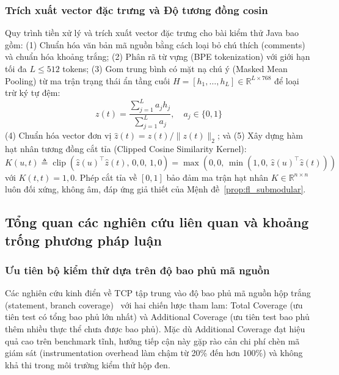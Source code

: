 \subsubsection{Trích xuất vector đặc trưng và Độ tương đồng cosin}
\label{subsubsec:embedding_cosine_similarity}

Quy trình tiền xử lý và trích xuất vector đặc trưng cho bài kiểm thử Java bao gồm: (1) Chuẩn hóa văn bản mã nguồn bằng cách loại bỏ chú thích (comments) và chuẩn hóa khoảng trắng; (2) Phân rã từ vựng (BPE tokenization) với giới hạn tối đa $L \le 512$ tokens; (3) Gom trung bình có mặt nạ chú ý (Masked Mean Pooling) từ ma trận trạng thái ẩn tầng cuối $H = [h_1, \dots, h_L] \in \mathbb{R}^{L \times 768}$ để loại trừ ký tự đệm:
\begin{equation}
\label{eq:masked_mean_pooling}
z(t) = \frac{\sum_{j=1}^L a_j h_j}{\sum_{j=1}^L a_j}, \quad a_j \in \{0, 1\}
\end{equation}
(4) Chuẩn hóa vector đơn vị $\widehat{z}(t) = z(t) / \|z(t)\|_2$; và (5) Xây dựng hàm hạt nhân tương đồng cắt tỉa (Clipped Cosine Similarity Kernel):
\begin{equation}
\label{eq:kernel_clipped_def}
K(u, t) \triangleq \operatorname{clip}\left(\widehat{z}(u)^\top \widehat{z}(t), \, 0{,}0, \, 1{,}0\right) = \max\left(0{,}0, \, \min\left(1{,}0, \, \widehat{z}(u)^\top \widehat{z}(t)\right)\right)
\end{equation}
với $K(t, t) = 1{,}0$. Phép cắt tỉa về $[0, 1]$ bảo đảm ma trận hạt nhân $K \in \mathbb{R}^{n \times n}$ luôn đối xứng, không âm, đáp ứng giả thiết của Mệnh đề~\ref{prop:fl_submodular}.

\subsection{Tổng quan các nghiên cứu liên quan và khoảng trống phương pháp luận}
\label{subsec:related_work}

\subsubsection{Ưu tiên bộ kiểm thử dựa trên độ bao phủ mã nguồn}
\label{subsubsec:coverage_based_tcp}

Các nghiên cứu kinh điển về TCP tập trung vào độ bao phủ mã nguồn hộp trắng (statement, branch coverage)~\cite{rothermel1999tcp, elbaum2002tcp, yoo2012regression} với hai chiến lược tham lam: Total Coverage (ưu tiên test có tổng bao phủ lớn nhất) và Additional Coverage (ưu tiên test bao phủ thêm nhiều thực thể chưa được bao phủ). Mặc dù Additional Coverage đạt hiệu quả cao trên benchmark tĩnh, hướng tiếp cận này gặp rào cản chi phí chèn mã giám sát (instrumentation overhead làm chậm từ 20\% đến hơn 100\%) và không khả thi trong môi trường kiểm thử hộp đen.

